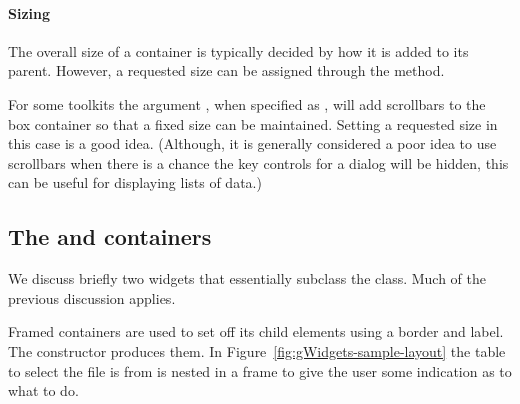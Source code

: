 



\paragraph{Sizing}
The overall size of a  container is typically decided by
how it is added to its parent. However, a requested size can be assigned
through the  method. 


For some toolkits the argument ,
when specified as , will add scrollbars to the box
container so that a fixed size can be maintained. Setting a requested
size in this case is a good idea. (Although, it is generally
considered a poor idea to use scrollbars when there is a chance the
key controls for a dialog will be hidden, this can be useful for
displaying lists of data.)






\subsection{The  and  containers}
\label{sec:gWidgets-decorated-cont}

We discuss briefly two widgets that essentially subclass the
 class. Much of the previous discussion applies.

Framed containers are used to set off its child elements using a
border and label. The  constructor produces
them. In Figure~\ref{fig:gWidgets-sample-layout} the table to select
the file is from is nested in a frame to give the user some indication
as to what to do.

